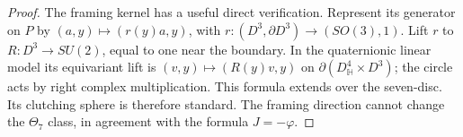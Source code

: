 \begin{proof}
The framing kernel has a useful direct verification. Represent
its generator on $P$ by
$(a,y)\mapsto(r(y)a,y)$, with
$r:(D^3,\partial D^3)\to(SO(3),1)$. Lift $r$ to
$R:D^3\to SU(2)$, equal to one near the boundary. In the
quaternionic linear model its equivariant lift is
$(v,y)\mapsto(R(y)v,y)$ on
$\partial(D^4_{\mathbb H}\times D^3)$; the circle acts by
right complex multiplication. This formula extends over the
seven-disc. Its clutching sphere is therefore standard.
The framing direction cannot change the $\Theta_7$ class,
in agreement with the formula $J=-\varphi$.
\end{proof}

